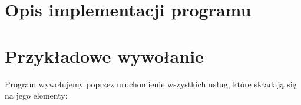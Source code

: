 \documentclass[12pt]{article}
\begin{document}
\section{Opis implementacji programu}
\label{dzialanie}
\section{Przykładowe wywołanie}
Program wywołujemy poprzez uruchomienie wszystkich usług, które składają się na jego elementy:

\end{document}
